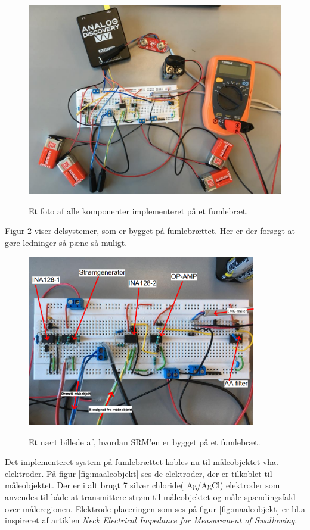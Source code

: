 \begin{figure}[H]
\centering
{\includegraphics[width=12cm]
{Figure/SamledeSystem}}
\caption{Et foto af alle komponenter implementeret på et fumlebræt. }
\label{fig:integrationstestBilleder1}
\end{figure} 


Figur \ref{aaspectrumimplementering} viser delsystemer, som er bygget på fumlebrættet. Her er der forsøgt at gøre ledninger så pæne så muligt. 

\begin{figure}[H] 
\centering
{\includegraphics[width=10cm]
{Figure/aaspectrumimplementering}}
\caption{Et nært billede af, hvordan SRM'en er bygget på et fumlebræt.}
\label{aaspectrumimplementering}
\end{figure}

\pagebreak


Det implementeret system på fumlebrættet kobles nu til måleobjektet vha. elektroder. På figur \ref{fig:maaleobjekt} ses de elektroder, der er tilkoblet til måleobjektet. Der er i alt brugt 7  silver chloride( Ag/AgCl)  elektroder som anvendes til både at transmittere strøm til måleobjektet og måle spændingsfald over måleregionen. Elektrode placeringen som ses på figur \ref{fig:maaleobjekt} er bl.a inspireret af artiklen \textit{Neck Electrical Impedance for Measurement of Swallowing}.     

